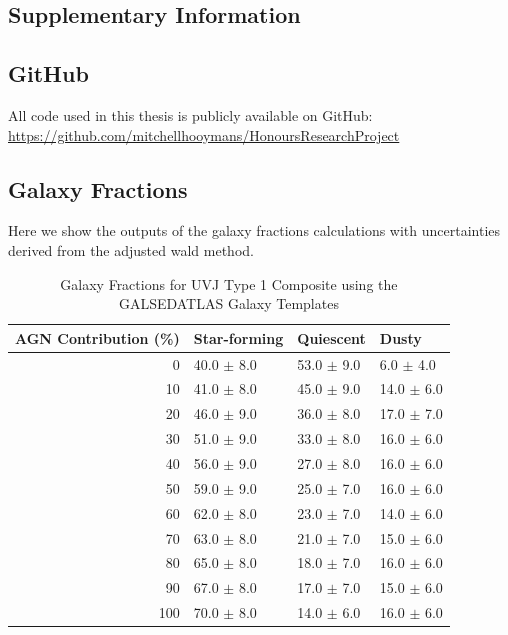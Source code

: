 \begin{appendices}

\chapter{Supplementary Information}
\thispagestyle{empty}

\section{GitHub}
All code used in this thesis is publicly available on GitHub:
\url{https://github.com/mitchellhooymans/HonoursResearchProject}

\newpage
\section{Galaxy Fractions}
Here we show the outputs of the galaxy fractions calculations with uncertainties derived from the adjusted wald method.

\begin{table}[h]
\centering
\begin{tabular}{rlll}
\hline
AGN Contribution (\%) & Star-forming & Quiescent & Dusty \\
\hline
0 & 40.0 $\pm$ 8.0 & 53.0 $\pm$ 9.0 & 6.0 $\pm$ 4.0 \\
10 & 41.0 $\pm$ 8.0 & 45.0 $\pm$ 9.0 & 14.0 $\pm$ 6.0 \\
20 & 46.0 $\pm$ 9.0 & 36.0 $\pm$ 8.0 & 17.0 $\pm$ 7.0 \\
30 & 51.0 $\pm$ 9.0 & 33.0 $\pm$ 8.0 & 16.0 $\pm$ 6.0 \\
40 & 56.0 $\pm$ 9.0 & 27.0 $\pm$ 8.0 & 16.0 $\pm$ 6.0 \\
50 & 59.0 $\pm$ 9.0 & 25.0 $\pm$ 7.0 & 16.0 $\pm$ 6.0 \\
60 & 62.0 $\pm$ 8.0 & 23.0 $\pm$ 7.0 & 14.0 $\pm$ 6.0 \\
70 & 63.0 $\pm$ 8.0 & 21.0 $\pm$ 7.0 & 15.0 $\pm$ 6.0 \\
80 & 65.0 $\pm$ 8.0 & 18.0 $\pm$ 7.0 & 16.0 $\pm$ 6.0 \\
90 & 67.0 $\pm$ 8.0 & 17.0 $\pm$ 7.0 & 15.0 $\pm$ 6.0 \\
100 & 70.0 $\pm$ 8.0 & 14.0 $\pm$ 6.0 & 16.0 $\pm$ 6.0 \\
\hline
\end{tabular}
\caption{Galaxy Fractions for UVJ Type 1 Composite using the GALSEDATLAS Galaxy Templates}
\end{table}


\end{appendices}
